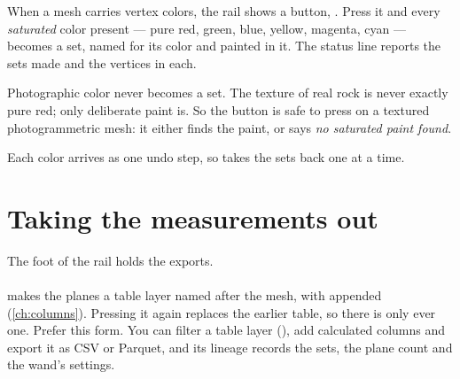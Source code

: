 When a mesh carries vertex colors, the rail shows a button, . Press it and every \emph{saturated} color present — pure red, green, blue, yellow, magenta, cyan — becomes a set, named for its color and painted in it. The status line reports the sets made and the vertices in each.

Photographic color never becomes a set. The texture of real rock is never exactly pure red; only deliberate paint is. So the button is safe to press on a textured photogrammetric mesh: it either finds the paint, or says \emph{no saturated paint found}.

Each color arrives as one undo step, so  takes the sets back one at a time.

\section{Taking the measurements out}\label{sec:structure-out}

The foot of the rail holds the exports.

\paragraph{} makes the planes a table layer named after the mesh, with  appended (\cref{ch:columns}). Pressing it again replaces the earlier table, so there is only ever one. Prefer this form. You can filter a table layer (), add calculated columns and export it as CSV or Parquet, and its lineage records the sets, the plane count and the wand's settings.

